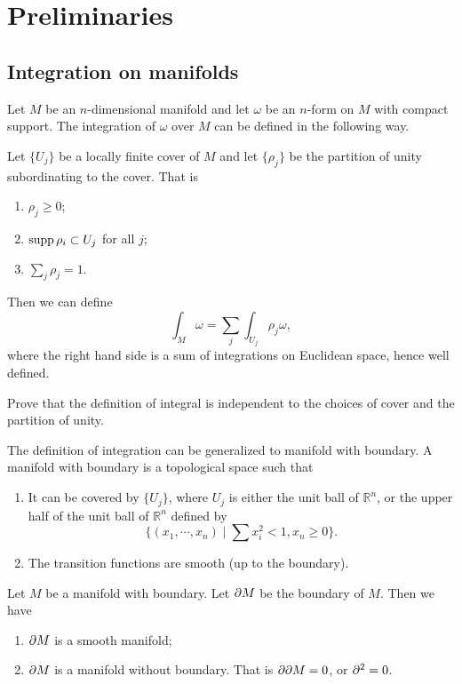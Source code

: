 \chapter{Preliminaries}\label{Preliminaries}
\section{Integration on manifolds}\label{Integration}

Let $M$ be an $n$-dimensional manifold and let $\omega$ be an $n$-form on $M$ with compact support. The integration of $\omega$ over $M$ can be defined in the following way.

Let $\{ U_j\}$ be a locally finite cover of $M$ and let $\{\rho_j\}$ be the partition of unity subordinating to the cover. That is
\begin{enumerate}
\item $\rho_j\geq 0$;
\item ${\rm supp}\,\rho_i\subset U_j$ for all $j$;
\item $\sum _j\rho_j=1$.
\end{enumerate}



Then we can define
\[
\int_M\omega=\sum_j\int_{U_j}\rho_j\omega,
\]
where the right hand side is a sum of integrations on Euclidean space, hence well defined.


\begin{ex} Prove that  the definition of integral is independent to the choices of cover and the partition of unity.
\end{ex}

The definition of integration can be generalized to manifold with boundary. A manifold with boundary  is a topological space such that
\begin{enumerate}
\item It  can be covered by  $\{U_j\}$, where $U_j$ is either the unit ball of $\mathbb R^n$, or the upper half of the unit ball of $\mathbb R^n$ defined by
\[
\{(x_1,\cdots,x_n)\mid\sum x_i^2<1,x_n\geq 0\}.
\]
\item The transition functions are smooth (up to the boundary).
\end{enumerate}

Let $M$ be a manifold with boundary. Let $\partial M$ be the boundary of $M$. Then we have
\begin{enumerate}
\item $\partial M$ is a smooth manifold;
\item $\partial M$ is a manifold without boundary. That is $\partial\partial M=0$, or $\partial^2=0$.
\end{enumerate}

